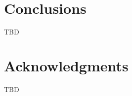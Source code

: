 \documentclass{acm_proc_article-sp}
\begin{document}
\section{Conclusions}
TBD

\section{Acknowledgments}
TBD

%

%
%
\end{document}
